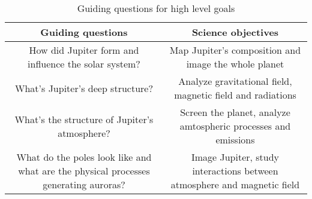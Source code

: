 \renewcommand{\arraystretch}{1.5}
\begin{table}[H]
    \centering
    \begin{tabular}{|c|c|}
        \hline
        \textbf{Guiding questions} & \textbf{Science objectives} \\ 
        \hline
        How did Jupiter form and influence the solar system? & Map Jupiter's composition and image the whole planet \\ 
        \hline
        What's Jupiter's deep structure? & Analyze gravitational field, magnetic field and radiations  \\ 
        \hline
        What's the structure of Jupiter's atmosphere? & Screen the planet, analyze amtospheric processes and emissions  \\ 
        \hline
        What do the poles look like and what are the physical processes generating auroras? & Image Jupiter, study interactions between atmosphere and magnetic field \\ 
        \hline
     
    \end{tabular}
    \centering
    \caption{Guiding questions for high level goals}
    \label{tab:Guiding questions for high level goals}
\end{table}

\renewcommand{\arraystretch}{1}

